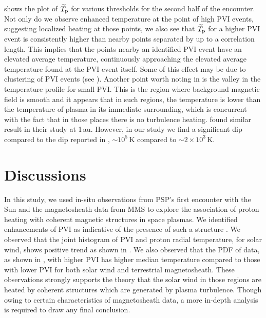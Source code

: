          shows the plot of $\widetilde{T}_{\rm p}$ for various thresholds for
        the second half of the encounter. Not only do we observe enhanced temperature at the point
        of high PVI events, suggesting localized heating at those points, we also see that
        $\widetilde{T}_{\rm p}$ for a higher PVI event is consistently higher than nearby points
        separated by up to a correlation length. This implies that the points nearby an identified
        PVI event have an elevated average temperature, continuously approaching the elevated
        average temperature found at the PVI event itself. Some of this effect may be due to
        clustering of PVI events (see \citet{Chhiber2020}). Another point worth noting in
         is the valley in the temperature profile for small PVI. This is the
        region where background magnetic field is smooth and it appears that in such regions, the
        temperature is lower than the temperature of plasma in its immediate surrounding, which is
        concurrent with the fact that in those places there is no turbulence heating.
        \citet{Osman2012a} found similar result in their study at 1\,au. However, in our study we
        find a significant dip compared to the dip reported in \citet{Osman2012a}, $\sim 10^5$\,K
        compared to $\sim 2\times 10^3$\,K.

    \section{Discussions} \label{sec:conc6}

        In this study, we used in-situ observations from PSP's first encounter with the Sun and the
        magnetosheath data from MMS to explore the association of proton heating with coherent
        magnetic structures in space plasmas. We identified enhancements of PVI \citep{Greco2008} as
        indicative of the presence of such a structure \citep{Osman2011, Osman2012a}. We observed
        that the joint histogram of PVI and proton radial temperature, for solar wind, shows
        positive trend as shown in . We also observed that the PDF of data, as
        shown in , with higher PVI has higher median
        temperature compared to those with lower PVI for both solar wind and terrestrial
        magnetosheath. These observations strongly supports the theory that the solar wind in those
        regions are heated by coherent structures which are generated by plasma turbulence. Though
        owing to certain characteristics of magnetosheath data, a more in-depth analysis is required
        to draw any final conclusion.

